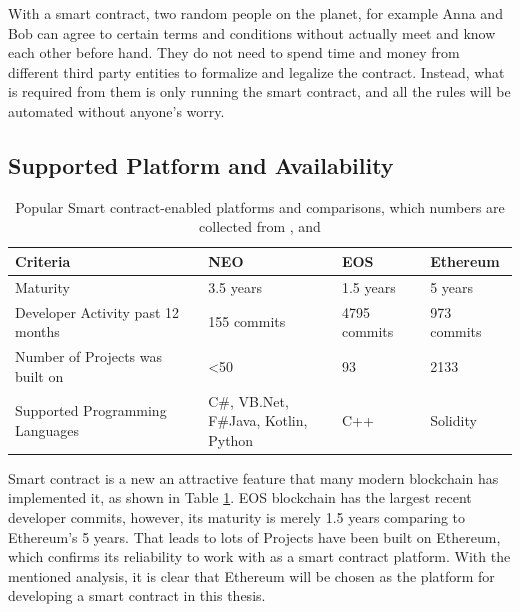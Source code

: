 \documentclass[twoside,numperchapter]{tutthesis} %
\begin{document}
With a smart contract, two random people on the planet, for example Anna and Bob can agree to certain terms and conditions without actually meet and know each other before hand. They do not need to spend time and money from different third party entities to formalize and legalize the contract. Instead, what is required from them is only running the smart contract, and all the rules will be automated without anyone's worry.

\subsection{Supported Platform and Availability}

\begin{table}[h]
\begin{tabular}{|l|l|l|l|}
\hline
\textbf{Criteria}                 & \textbf{NEO}                         & \textbf{EOS} & \textbf{Ethereum} \\ \hline
Maturity                          & 3.5 years                            & 1.5 years    & 5 years           \\ \hline
Developer Activity past 12 months & 155 commits                          & 4795 commits & 973 commits       \\ \hline
Number of Projects was built on   & \textless{}50                        & 93           & 2133              \\ \hline
Supported Programming Languages   & \makecell{C\#, VB.Net, \\ F\#Java, Kotlin, Python} & C++        & Solidity          \\ \hline
\end{tabular}
\caption{Popular Smart contract-enabled platforms and comparisons, which numbers are collected from \citep{StateOfDapps}, \citep{CrytoProjectsActivity} and \citep{NEODappsNumber} }
\label{table:popularSmartContractPlatform}
\end{table}

Smart contract is a new an attractive feature that many modern blockchain has implemented it, as shown in Table \ref{table:popularSmartContractPlatform}. EOS blockchain has the largest recent developer commits, however, its maturity is merely 1.5 years comparing to Ethereum's 5 years. That leads to lots of Projects have been built on Ethereum, which confirms its reliability to work with as a smart contract platform. With the mentioned analysis, it is clear that Ethereum will be chosen as the platform for developing a smart contract in this thesis.
\end{document}
